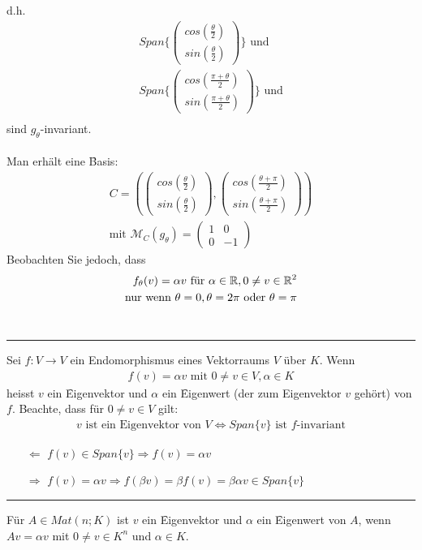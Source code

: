 d.h.
\begin{align}
Span \{\begin{pmatrix} cos(\frac{\theta}{2}) \\ sin(\frac{\theta}{2})\end{pmatrix}\} \text{ und} \\
Span \{\begin{pmatrix} cos(\frac{\pi+\theta}{2}) \\ sin(\frac{\pi+\theta}{2})\end{pmatrix}\} \text{ und} \\
\end{align}
sind \f{$g_{\theta}$-invariant}.\\\\
Man erhält eine \f{Basis}:
\begin{align}
C = \left( \begin{pmatrix} cos(\frac{\theta}{2}) \\ sin(\frac{\theta}{2})\end{pmatrix}, \begin{pmatrix} cos(\frac{\theta+\pi}{2}) \\ sin(\frac{\theta+\pi}{2})\end{pmatrix}\right) \\
\text{mit } \mathcal{M}_C(g_{\theta}) = \begin{pmatrix} 1 & 0 \\ 0 & -1 \end{pmatrix}
\end{align}
Beobachten Sie jedoch, dass
\begin{align}
f_{\theta}(v) = \alpha v \text{ für } \alpha\in \mathbb{R}, 0 \neq v \in \mathbb{R}^2 \\
\text{nur wenn } \theta = 0, \theta = 2 \pi \text{ oder } \theta = \pi
\end{align}
\vspace*{0.2cm} \\ \rule{\linewidth}{0.3mm}\vspace*{0.1cm}
Sei $f:  V \rightarrow V$ ein Endomorphismus eines Vektorraums $V$ über $K$. Wenn
\begin{align}
f(v) = \alpha v \text{ mit } 0 \neq v \in V, \alpha \in K
\end{align}
heisst $v$ ein \f{Eigenvektor} und $\alpha$ ein \f{Eigenwert} (der zum Eigenvektor $v$ gehört) von $f$.
Beachte, dass für $0 \neq v \in V$ gilt:
\begin{align}
\text{$v$ ist ein Eigenvektor von $V$} \Leftrightarrow Span\{v\} \text{ ist $f$-invariant}
\end{align}
\begin{itemize}
 \item[$\Leftarrow$] $f(v) \in Span\{v\} \Rightarrow f(v) = \alpha v$
 \item[$\Rightarrow$] $f(v) = \alpha v \Rightarrow f(\beta v) = \beta f(v) = \beta \alpha v \in Span\{v\}$
\end{itemize}
\vspace*{0.2cm} \rule{\linewidth}{0.3mm}\vspace*{0.1cm}
Für $A \in Mat(n;K)$ ist $v$ ein \f{Eigenvektor} und $\alpha$ ein \f{Eigenwert} von $A$, wenn $Av = \alpha v$ mit $0 \neq v \in K^n$ und $\alpha \in K$.

